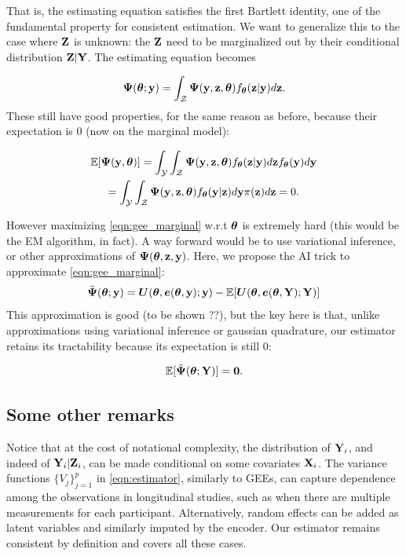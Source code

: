 \documentclass[twoside,11pt]{article}
\begin{document}
That is, the estimating equation satisfies the first Bartlett identity, one of the fundamental property for consistent estimation. We want to generalize this to the case where ${\bf Z}$ is unknown: the ${\bf Z}$ need to be marginalized out by their conditional distribution ${\bf Z}|{\bf Y}$. The estimating equation becomes

\begin{equation}
\bm \Psi({\bm{\theta}};{\bf y}) = \int_{\mathcal Z}\bm\Psi({\bf y}, {\bf z}, {\bm{\theta}})f_{\bm{\theta}}({\bf z}|{\bf y})d{\bf z}.
\label{eqn:gee_marginal}
\end{equation}
These still have good properties, for the same reason as before, because their expectation is 0 (now on the marginal model):

\begin{multline}
\mathbb{E}[\bm\Psi({\bf y}, {\bm{\theta}})] = \int_{\mathcal Y}\int_{\mathcal Z}\bm\Psi({\bf y}, {\bf z}, {\bm{\theta}})f_{\bm{\theta}}({\bf z}|{\bf y})d{\bf z} f_{\bm{\theta}}({\bf y})d{\bf y} 
\\= \int_{\mathcal Y}\int_{\mathcal Z}\bm\Psi({\bf y}, {\bf z}, {\bm{\theta}})f_{\bm{\theta}}({\bf y}|{\bf z})d{\bf y} \pi({\bf z}) d{\bf z} = 0.
\end{multline}

However maximizing \eqref{eqn:gee_marginal} w.r.t ${\bm{\theta}}$ is extremely hard (this would be the EM algorithm, in fact). A way forward would be to use variational inference, or other approximations of $\bm\Psi({\bm{\theta}}, {\bf z}, {\bf y})$. Here, we propose the AI trick to approximate \eqref{eqn:gee_marginal}:
%
\begin{equation}
    \tilde{\bm\Psi}({\bm{\theta}};{\bf y}) = \bm U({\bm{\theta}}, {\bm e}({\bm{\theta}}, {\bf y}); {\bf y}) - \mathbb{E}[\bm U({\bm{\theta}}, {\bm e}({\bm{\theta}}, {\bf Y}); {\bf Y})]
\end{equation}
%
This approximation is good (to be shown ??), but the key here is that, unlike approximations using variational inference or gaussian quadrature, our estimator retains its tractability because its expectation is still 0:

\begin{equation}
    \mathbb{E}[\tilde{\bm\Psi}({\bm{\theta}};{\bf Y})] = \bm 0.
\end{equation}

\subsection{Some other remarks}

Notice that at the cost of notational complexity, the distribution of ${\bf Y}_i$, and indeed of ${\bf Y}_i|{\bf Z}_i$, can be made conditional on some covariates ${\bf X}_i$.
The variance functions $\{V_j\}_{j=1}^p$ in \eqref{eqn:estimator}, similarly to GEEs, can capture dependence among the observations in longitudinal studies, such as when there are multiple measurements for each participant. Alternatively, random effects can be added as latent variables and similarly imputed by the encoder. Our estimator remains consistent by definition and covers all these cases.
\end{document}
